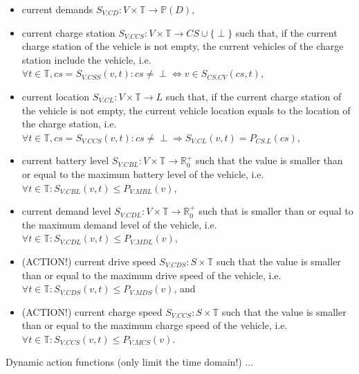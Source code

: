 \documentclass[graybox]{svmult}
\begin{document}
\begin{itemize}
	\item current demands $S_{V.CD}: V \times \mathbb{T} \rightarrow \mathbb{P}(D)$,
	\item current charge station $S_{V.CCS}: V \times \mathbb{T} \rightarrow CS \cup \{\perp\}$ such that, if the current charge station of the vehicle is not empty, the current vehicles of the charge station include the vehicle, i.e.\ $\forall t \in \mathbb{T}, cs = S_{V.CSS}(v,t): cs \neq \perp \Leftrightarrow v \in S_{CS.CV}(cs,t)$,
	\item current location $S_{V.CL}: V \times \mathbb{T} \rightarrow L$ such that, if the current charge station of the vehicle is not empty, the current vehicle location equals to the location of the charge station, i.e.\ $\forall t \in \mathbb{T}, cs = S_{V.CCS}(v,t): cs \neq \perp \Rightarrow S_{V.CL}(v,t)=P_{CS.L}(cs)$,
	\item current battery level $S_{V.CBL}: V \times \mathbb{T} \rightarrow \mathbb{R}_0^+$ such that the value is smaller than or equal to the maximum battery level of the vehicle, i.e.\ $\forall t \in \mathbb{T}: S_{V.CBL}(v,t) \leq P_{V.MBL}(v)$,
	\item current demand level $S_{V.CDL}: V \times \mathbb{T} \rightarrow \mathbb{R}_0^+$ such that is smaller than or equal to the maximum demand level of the vehicle, i.e.\ $\forall t \in \mathbb{T}: S_{V.CDL}(v,t) \leq P_{V.MDL}(v)$,
	\item (ACTION!) current drive speed $S_{V.CDS}: S \times \mathbb{T}$ such that the value is smaller than or equal to the maximum drive speed of the vehicle, i.e.\ $\forall t \in \mathbb{T}: S_{V.CDS}(v,t) \leq P_{V.MDS}(v)$, and
	\item (ACTION!) current charge speed $S_{V.CCS}: S \times \mathbb{T}$ such that the value is smaller than or equal to the maximum charge speed of the vehicle, i.e.\ $\forall t \in \mathbb{T}: S_{V.CCS}(v,t) \leq P_{V.MCS}(v)$.
\end{itemize}
Dynamic action functions (only limit the time domain!) ...
\end{document}

